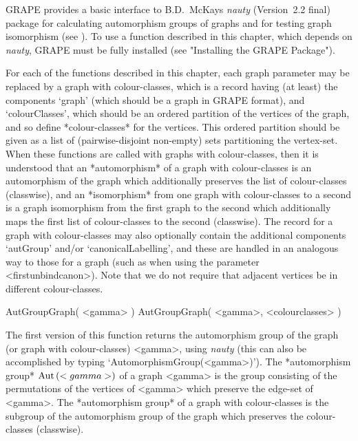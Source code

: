 %
%
%
%
\def\GRAPE{\sf GRAPE}
\def\nauty{\it nauty}
\def\G{\Gamma}
\def\Aut{{\rm Aut}\,}
\def\x{\times}

{\GRAPE} provides a basic interface to B.D.~McKay{\pif}s {\nauty}
(Version~2.2 final) package for calculating automorphism groups of
graphs and for testing graph isomorphism (see \cite{Nau90}). To use a
function described in this chapter, which depends on {\nauty}, {\GRAPE}
must be fully installed (see "Installing the GRAPE Package").


For each of the functions described in this chapter, each graph parameter
may be replaced by a graph with colour-classes, which is a record having
(at least) the components `graph' (which should be a graph in {\GRAPE}
format), and `colourClasses', which should be an ordered partition of the
vertices of the graph, and so define *colour-classes* for the vertices.
This ordered partition should be given as a list of (pairwise-disjoint
non-empty) sets partitioning the vertex-set.  When these functions are
called with graphs with colour-classes, then it is understood that an
*automorphism* of a graph with colour-classes is an automorphism of the
graph which additionally preserves the list of colour-classes (classwise),
and an *isomorphism* from one graph with colour-classes to a second is a
graph isomorphism from the first graph to the second which additionally
maps the first list of colour-classes to the second (classwise). The
record for a graph with colour-classes may also optionally contain the
additional components `autGroup' and/or `canonicalLabelling', and these
are handled in an analogous way to those for a graph (such as when using
the parameter <firstunbindcanon>).  Note that we do not require that
adjacent vertices be in different colour-classes.


\>AutGroupGraph( <gamma> )
\>AutGroupGraph( <gamma>, <colourclasses> )

The first version of this function returns the automorphism group of
the graph (or graph with colour-classes) <gamma>, using {\nauty} (this
can also be accomplished by typing `AutomorphismGroup(<gamma>)'). The
*automorphism group* $\Aut(<gamma>)$ of a graph <gamma> is the
group consisting of the permutations of the vertices of <gamma> which
preserve the edge-set of <gamma>.  The *automorphism group* of a graph
with colour-classes is the subgroup of the automorphism group of the
graph which preserves the colour-classes (classwise).


